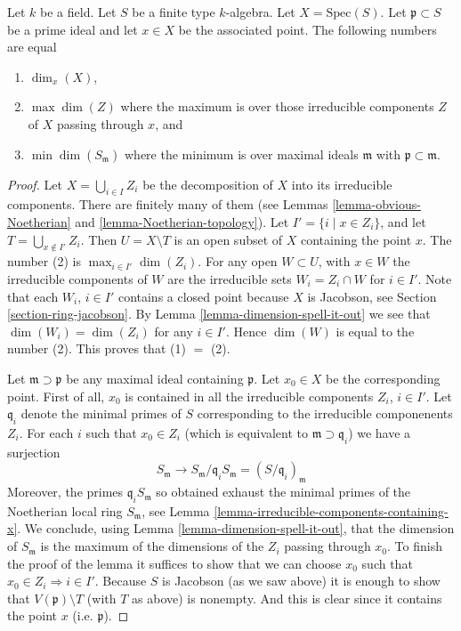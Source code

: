 \begin{lemma}
\label{lemma-dimension-at-a-point-finite-type-over-field}
Let $k$ be a field.
Let $S$ be a finite type $k$-algebra.
Let $X = \text{Spec}(S)$.
Let $\mathfrak p \subset S$ be a prime ideal and let
$x \in X$ be the associated point.
The following numbers are equal
\begin{enumerate}
\item $\dim_x(X)$,
\item $\max \dim(Z)$ where the maximum is over those
irreducible components $Z$ of $X$ passing through $x$, and
\item $\min \dim(S_{\mathfrak m})$ where the minimum
is over maximal ideals $\mathfrak m$ with
$\mathfrak p \subset \mathfrak m$.
\end{enumerate}
\end{lemma}

\begin{proof}
Let $X = \bigcup_{i \in I} Z_i$ be the decomposition of $X$ into
its irreducible components. There are finitely many of
them (see
Lemmas \ref{lemma-obvious-Noetherian} and \ref{lemma-Noetherian-topology}).
Let $I' = \{i \mid x \in Z_i\}$, and let
$T = \bigcup_{x \not \in I'} Z_i$. Then $U = X \setminus T$
is an open subset of $X$ containing the point $x$.
The number (2) is $\max_{i \in I'} \dim(Z_i)$.
For any open $W \subset U$, with $x \in W$
the irreducible components of $W$ are the irreducible sets
$W_i = Z_i \cap W$ for $i \in I'$.
Note that each $W_i$, $i \in I'$ contains a closed point because
$X$ is Jacobson, see Section \ref{section-ring-jacobson}.
By Lemma \ref{lemma-dimension-spell-it-out} we see that
$\dim(W_i) = \dim(Z_i)$ for any $i \in I'$. Hence $\dim(W)$
is equal to the number (2). This proves that (1) $ = $ (2).

\medskip\noindent
Let $\mathfrak m \supset \mathfrak p$ be any maximal ideal
containing $\mathfrak p$. Let $x_0 \in X$ be the corresponding
point. First of all, $x_0$ is contained in all the
irreducible components $Z_i$, $i \in I'$. Let $\mathfrak q_i$
denote the minimal primes of $S$ corresponding to the
irreducible componenents $Z_i$. For each $i$ such that
$x_0 \in Z_i$ (which is equivalent to $\mathfrak m \supset \mathfrak q_i$)
we have a surjection
$$
S_{\mathfrak m} \longrightarrow
S_\mathfrak m/\mathfrak q_i S_\mathfrak m =(S/\mathfrak q_i)_{\mathfrak m}
$$
Moreover, the primes $\mathfrak q_i S_\mathfrak m$ so obtained
exhaust the minimal
primes of the Noetherian local ring $S_{\mathfrak m}$, see
Lemma \ref{lemma-irreducible-components-containing-x}.
We conclude, using Lemma \ref{lemma-dimension-spell-it-out},
that the dimension of $S_{\mathfrak m}$ is the
maximum of the dimensions of the $Z_i$ passing through $x_0$.
To finish the proof of the lemma it suffices to show that
we can choose $x_0$ such that $x_0 \in Z_i \Rightarrow i \in I'$.
Because $S$ is Jacobson (as we saw above)
it is enough to show that $V(\mathfrak p) \setminus T$
(with $T$ as above) is nonempty. And this is clear since it
contains the point $x$ (i.e. $\mathfrak p$).
\end{proof}

